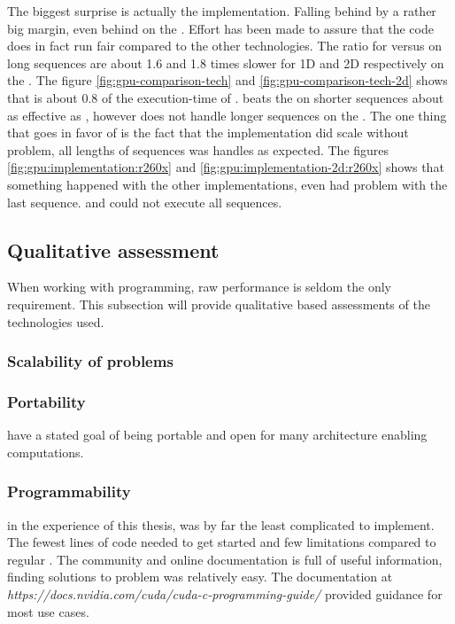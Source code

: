 The biggest surprise is actually the {\OCL} implementation. Falling behind by a rather big margin, even behind on the \AMDCARD. Effort has been made to assure that the code does in fact run fair compared to the other technologies. The ratio for {\OCL} versus {\CU} on long sequences are about 1.6 and 1.8 times slower for 1D and 2D respectively on the {\NVCARD}. The figure \ref{fig:gpu-comparison-tech} and \ref{fig:gpu-comparison-tech-2d} shows that {\DX} is about 0.8 of the execution-time of {\OCL}. {\GL} beats the {\OCL} on shorter sequences about as effective as {\DX}, however does not handle longer sequences on the {\AMDCARD}. The one thing that goes in favor of {\OCL} is the fact that the implementation did scale without problem, all lengths of sequences was handles as expected. The figures \ref{fig:gpu:implementation:r260x} and \ref{fig:gpu:implementation-2d:r260x} shows that something happened with the other implementations, even {\CLFFT} had problem with the last sequence. {\GL} and {\DX} could not execute all sequences.

\subsection{Qualitative assessment}

When working with programming, raw performance is seldom the only requirement. This subsection will provide qualitative based assessments of the technologies used.

\subsubsection{Scalability of problems}



\subsubsection{Portability}

{\OCL} have a stated goal of being portable and open for many architecture enabling computations.

\subsubsection{Programmability}

{\CU} in the experience of this thesis, {\CU} was by far the least complicated to implement. The fewest lines of code needed to get started and few limitations compared to regular {\CPP}. The {\CU} community and online documentation is full of useful information, finding solutions to problem was relatively easy. The documentation at \textit{https://docs.nvidia.com/cuda/cuda-c-programming-guide/} provided guidance for most use cases.

